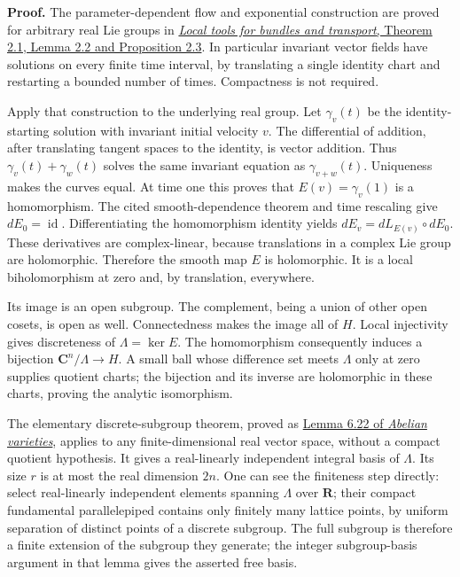 \documentclass[
  11pt,
  a4paper,
]{article}
\begin{document}
\textbf{Proof.} The parameter-dependent flow and exponential
construction are proved for arbitrary real Lie groups in
\href{https://kokunoyumeto.github.io/open-math-courses-public/courses/DG-FND/local-tools-for-bundles-and-transport.html\#2-differential-equations-and-their-parameters}{\emph{Local
tools for bundles and transport}, Theorem 2.1, Lemma 2.2 and Proposition
2.3}. In particular invariant vector fields have solutions on every
finite time interval, by translating a single identity chart and
restarting a bounded number of times. Compactness is not required.

Apply that construction to the underlying real group. Let
\(\gamma_v(t)\) be the identity-starting solution with invariant initial
velocity \(v\). The differential of addition, after translating tangent
spaces to the identity, is vector addition. Thus
\(\gamma_v(t)+\gamma_w(t)\) solves the same invariant equation as
\(\gamma_{v+w}(t)\). Uniqueness makes the curves equal. At time one this
proves that \(E(v)=\gamma_v(1)\) is a homomorphism. The cited
smooth-dependence theorem and time rescaling give
\(dE_0=\operatorname{id}\). Differentiating the homomorphism identity
yields \(dE_v=dL_{E(v)}\circ dE_0\). These derivatives are
complex-linear, because translations in a complex Lie group are
holomorphic. Therefore the smooth map \(E\) is holomorphic. It is a
local biholomorphism at zero and, by translation, everywhere.

Its image is an open subgroup. The complement, being a union of other
open cosets, is open as well. Connectedness makes the image all of
\(H\). Local injectivity gives discreteness of \(\Lambda=\ker E\). The
homomorphism consequently induces a bijection
\(\mathbf C^n/\Lambda\to H\). A small ball whose difference set meets
\(\Lambda\) only at zero supplies quotient charts; the bijection and its
inverse are holomorphic in these charts, proving the analytic
isomorphism.

The elementary discrete-subgroup theorem, proved as
\href{https://github.com/KokunoYumeto/open-math-courses-public/blob/146dc81802e69cf262fb6cc65c1b9f74e71f4625/docs/courses/AG-GS/src/abelian-varieties.md}{Lemma
6.22 of \emph{Abelian varieties}}, applies to any finite-dimensional
real vector space, without a compact quotient hypothesis. It gives a
real-linearly independent integral basis of \(\Lambda\). Its size \(r\)
is at most the real dimension \(2n\). One can see the finiteness step
directly: select real-linearly independent elements spanning \(\Lambda\)
over \(\mathbf R\); their compact fundamental parallelepiped contains
only finitely many lattice points, by uniform separation of distinct
points of a discrete subgroup. The full subgroup is therefore a finite
extension of the subgroup they generate; the integer subgroup-basis
argument in that lemma gives the asserted free basis.
\end{document}
